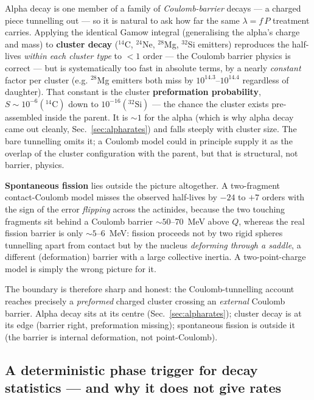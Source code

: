 \documentclass[11pt]{article}
\begin{document}
Alpha decay is one member of a family of \emph{Coulomb-barrier} decays --- a charged piece tunnelling out ---
so it is natural to ask how far the same $\lambda=f\,P$ treatment carries. Applying the identical Gamow
integral (generalising the alpha's charge and mass) to \textbf{cluster decay} ($^{14}$C, $^{24}$Ne, $^{28}$Mg,
$^{32}$Si emitters) reproduces the half-lives \emph{within each cluster type} to $<\!1$ order --- the Coulomb
barrier physics is correct --- but is systematically too fast in absolute terms, by a nearly \emph{constant}
factor per cluster (e.g. $^{28}$Mg emitters both miss by $10^{14.3}$--$10^{14.4}$ regardless of daughter). That
constant is the cluster \textbf{preformation probability}, $S\sim 10^{-6}(^{14}\mathrm{C})$ down to
$10^{-16}(^{32}\mathrm{Si})$ --- the chance the cluster exists pre-assembled inside the parent. It is $\sim\!1$
for the alpha (which is why alpha decay came out cleanly, Sec.~\ref{sec:alpharates}) and falls steeply with
cluster size. The bare tunnelling omits it; a Coulomb model could in principle supply it as the overlap of the
cluster configuration with the parent, but that is structural, not barrier, physics.

\textbf{Spontaneous fission} lies outside the picture altogether. A two-fragment contact-Coulomb model misses the
observed half-lives by $-24$ to $+7$ orders with the sign of the error \emph{flipping} across the actinides,
because the two touching fragments sit behind a Coulomb barrier $\sim\!50$--$70$~MeV above $Q$, whereas the real
fission barrier is only $\sim\!5$--$6$~MeV: fission proceeds not by two rigid spheres tunnelling apart from
contact but by the nucleus \emph{deforming through a saddle}, a different (deformation) barrier with a large
collective inertia. A two-point-charge model is simply the wrong picture for it.

The boundary is therefore sharp and honest: the Coulomb-tunnelling account reaches precisely a \emph{preformed}
charged cluster crossing an \emph{external} Coulomb barrier. Alpha decay sits at its centre (Sec.~\ref{sec:alpharates});
cluster decay is at its edge (barrier right, preformation missing); spontaneous fission is outside it (the barrier
is internal deformation, not point-Coulomb).

\subsection{A deterministic phase trigger for decay statistics --- and why it does not give rates}
\label{sec:phasedecay}
\end{document}
